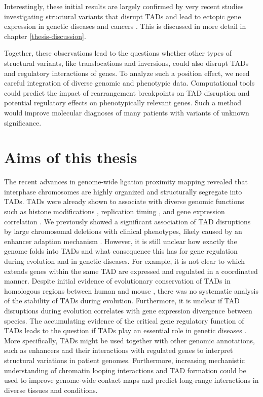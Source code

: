 \documentclass[a4paper,twoside=true,openright,parskip=full,chapterprefix=true,11pt,headings=normal,bibliography=totoc,listof=totoc,titlepage=on,captions=tableabove,draft=false]{scrreprt}
\theoremstyle{definition}
\theoremstyle{definition}
\theoremstyle{definition}
\theoremstyle{remark}
\begin{document}
Interestingly, these initial results are largely confirmed by very
recent studies investigating structural variants that disrupt TADs and
lead to ectopic gene expression in genetic diseases
\citep{Lupianez2015, Franke2016, Redin2017} and cancers
\citep{Northcott2014, Hnisz2016, Weischenfeldt2016}. This is discussed
in more detail in chapter \ref{thesis-discussion}.

Together, these observations lead to the questions whether other types
of structural variants, like translocations and inversions, could also
disrupt TADs and regulatory interactions of genes. To analyze such a
position effect, we need careful integration of diverse genomic and
phenotypic data. Computational tools could predict the impact of
rearrangement breakpoints on TAD disruption and potential regulatory
effects on phenotypically relevant genes. Such a method would improve
molecular diagnoses of many patients with variants of unknown
significance.

\hypertarget{aims-of-this-thesis}{%
\section{Aims of this thesis}\label{aims-of-this-thesis}}

The recent advances in genome-wide ligation proximity mapping revealed
that interphase chromosomes are highly organized and structurally
segregate into TADs. TADs were already shown to associate with diverse
genomic functions such as histone modifications
\citep{Dixon2012, Sexton2012}, replication timing \citep{Pope2014}, and
gene expression correlation \citep{Nora2012, LeDily2014}. We previously
showed a significant association of TAD disruptions by large chromosomal
deletions with clinical phenotypes, likely caused by an enhancer
adaption mechanism \citep{Ibn-Salem2014, Lupianez2015}. However, it is
still unclear how exactly the genome folds into TADs and what
consequence this has for gene regulation during evolution and in genetic
diseases. For example, it is not clear to which extends genes within the
same TAD are expressed and regulated in a coordinated manner. Despite
initial evidence of evolutionary conservation of TADs in homologous
regions between human and mouse \citep{Dixon2012, VietriRudan2015},
there was no systematic analysis of the stability of TADs during
evolution. Furthermore, it is unclear if TAD disruptions during
evolution correlates with gene expression divergence between species.
The accumulating evidence of the critical gene regulatory function of
TADs leads to the question if TADs play an essential role in genetic
diseases \citep{Spielmann2016}. More specifically, TADs might be used
together with other genomic annotations, such as enhancers and their
interactions with regulated genes to interpret structural variations in
patient genomes. Furthermore, increasing mechanistic understanding of
chromatin looping interactions and TAD formation could be used to
improve genome-wide contact maps and predict long-range interactions in
diverse tissues and conditions.
\end{document}
